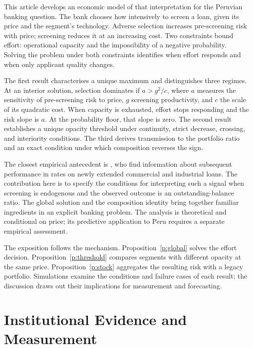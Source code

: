 \documentclass[11pt]{article}
\theoremstyle{definition}\newtheorem{assumption}{Assumption}
\begin{document}
This article develops an economic model of that interpretation for the
Peruvian banking question. The bank chooses how intensively to screen a loan,
given its price and the segment's technology. Adverse selection increases
pre-screening risk with price; screening reduces it at an increasing cost.
Two constraints bound effort: operational capacity and the impossibility of
a negative probability. Solving the problem under both constraints identifies
when effort responds and when only applicant quality changes.

The first result characterises a unique maximum and distinguishes three
regimes. At an interior solution, selection dominates if $a>g^2/c$, where
$a$ measures the sensitivity of pre-screening risk to price, $g$ screening
productivity, and $c$ the scale of its quadratic cost. When capacity is
exhausted, effort stops responding and the risk slope is $a$. At the
probability floor, that slope is zero. The second result establishes a
unique opacity threshold under continuity, strict decrease, crossing, and
interiority conditions. The third derives transmission to the portfolio
ratio and an exact condition under which composition reverses the sign.

The closest empirical antecedent is \citet{morgan2003}, who find information
about subsequent performance in rates on newly extended commercial and
industrial loans. The contribution here is to specify the conditions for
interpreting such a signal when screening is endogenous and the observed
outcome is an outstanding-balance ratio. The global solution and the
composition identity bring together familiar ingredients in an explicit
banking problem. The analysis is theoretical and conditional on price;
its predictive application to Peru requires a separate empirical assessment.

The exposition follows the mechanism. Proposition~\ref{p:global} solves
the effort decision. Proposition~\ref{p:threshold} compares segments with
different opacity at the same price. Proposition~\ref{p:stock} aggregates
the resulting risk with a legacy portfolio. Simulations examine the
conditions and failure cases of each result; the discussion draws out
their implications for measurement and forecasting.

\section{Institutional Evidence and Measurement}
\end{document}
